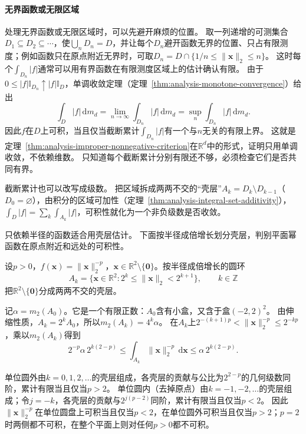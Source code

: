 \paragraph{无界函数或无限区域}

处理无界函数或无限区域时，可以先避开麻烦的位置。
取一列递增的可测集合$D_1\subseteq D_2\subseteq\cdots$，使$\bigcup_nD_n=D$，并让每个$D_n$避开函数无界的位置、只占有限测度；例如函数只在原点附近无界时，可取$D_n=D\cap\{1/n\leq\lVert\bm x\rVert_2\leq n\}$。
这时每个$\int_{D_n}|f|$通常可以用有界函数在有限测度区域上的估计确认有限。
由于$0\leq|f|\mathbb I_{D_n}\uparrow|f|\mathbb I_D$，单调收敛定理（定理~\ref{thm:analysis-monotone-convergence}）给出
\[
 \int_D|f|\,\mathrm dm_d
 =\lim_{n\to\infty}\int_{D_n}|f|\,\mathrm dm_d
 =\sup_n\int_{D_n}|f|\,\mathrm dm_d.
\]
因此$f$在$D$上可积，当且仅当截断累计$\int_{D_n}|f|$有一个与$n$无关的有限上界。
这就是定理~\ref{thm:analysis-improper-nonnegative-criterion}在$\mathbb R^d$中的形式，证明只用单调收敛，不依赖维数。
只知道每个截断累计分别有限还不够，必须检查它们是否共同有界。

截断累计也可以改写成级数。
把区域拆成两两不交的“壳层”$A_k=D_k\setminus D_{k-1}$（$D_0=\varnothing$），由积分的区域可加性（定理~\ref{thm:analysis-integral-set-additivity}），
$\int_D|f|=\sum_k\int_{A_k}|f|$，可积性就化为一个非负级数是否收敛。

只依赖半径的函数适合用壳层估计。
下面按半径成倍增长划分壳层，判别平面幂函数在原点附近和远处的可积性。
\begin{example}
\label{ex:region-power-function-threshold}
设$p>0$，$f(\bm x)=\lVert\bm x\rVert_2^{-p}$，$\bm x\in\mathbb R^2\setminus\{\bm 0\}$。按半径成倍增长的圆环
\[
 A_k=\{\bm x\in\mathbb R^2:2^k\leq\lVert\bm x\rVert_2<2^{k+1}\},\qquad k\in\mathbb Z
\]
把$\mathbb R^2\setminus\{\bm 0\}$分成两两不交的壳层。

记$\alpha=m_2(A_0)$。它是一个有限正数：$A_0$含有小盒，又含于盒$(-2,2)^2$。
由伸缩性质，$A_k=2^kA_0$，所以$m_2(A_k)=4^k\alpha$。
在$A_k$上$2^{-(k+1)p}<\lVert\bm x\rVert_2^{-p}\leq2^{-kp}$，乘以$m_2(A_k)$得到
\[
 2^{-p}\alpha\,2^{k(2-p)}\leq\int_{A_k}\lVert\bm x\rVert_2^{-p}\,\mathrm d\bm x\leq\alpha\,2^{k(2-p)}.
\]

单位圆外由$k=0,1,2,\ldots$的壳层组成，各壳层的贡献与公比为$2^{2-p}$的几何级数同阶，累计有限当且仅当$p>2$。
单位圆内（去掉原点）由$k=-1,-2,\ldots$的壳层组成；令$j=-k$，各壳层的贡献与$2^{j(p-2)}$同阶，累计有限当且仅当$p<2$。
因此$\lVert\bm x\rVert_2^{-p}$在单位圆盘上可积当且仅当$p<2$，在单位圆外可积当且仅当$p>2$；$p=2$时两侧都不可积，在整个平面上则对任何$p>0$都不可积。
\end{example}

